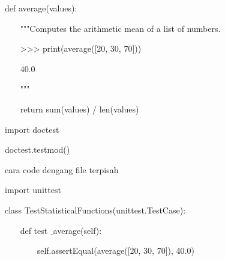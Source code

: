 \vspace{12pt}
\noindent 
{\fontsize{14pt}{14pt}\selectfont def average(values): \\} \par
\noindent 
{\fontsize{14pt}{14pt}\selectfont ~~~ """Computes the arithmetic mean of a list of numbers. \\} \par
\vspace{14pt}
\noindent 
{\fontsize{14pt}{14pt}\selectfont ~~~ >>> print(average([20, 30, 70])) \\} \par
\noindent 
{\fontsize{14pt}{14pt}\selectfont ~~~ 40.0 \\} \par
\noindent 
{\fontsize{14pt}{14pt}\selectfont ~~~ """ \\} \par
\noindent 
{\fontsize{14pt}{14pt}\selectfont ~~~ return sum(values) / len(values) \\} \par
\vspace{14pt}
\noindent 
{\fontsize{14pt}{14pt}\selectfont import doctest \\} \par
\noindent 
{\fontsize{14pt}{14pt}\selectfont doctest.testmod()~~  \\} \par
\vspace{14pt}
\noindent 
{\fontsize{14pt}{14pt}\selectfont cara code dengang file terpisah \\} \par
\vspace{14pt}
\noindent 
{\fontsize{14pt}{14pt}\selectfont import unittest \\} \par
\vspace{14pt}
\noindent 
{\fontsize{14pt}{14pt}\selectfont class TestStatisticalFunctions(unittest.TestCase): \\} \par
\vspace{14pt}
\noindent 
{\fontsize{14pt}{14pt}\selectfont ~~~ def test $  \_  $average(self): \\} \par
\vspace{14pt}
\noindent 
{\fontsize{14pt}{14pt}\selectfont ~~~~~~~ self.assertEqual(average([20, 30, 70]), 40.0) \\} \par
\vspace{14pt}
